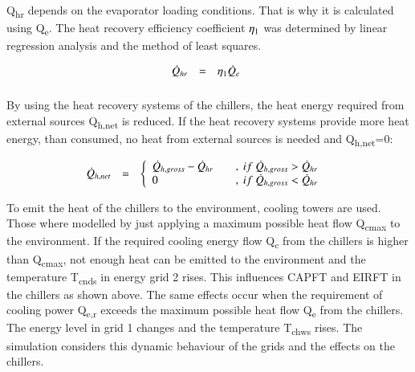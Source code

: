 \documentclass[3p,times,procedia,twocolumn,twoside]{elsarticle}
\begin{document}
Q\textsubscript{hr} depends on the evaporator loading conditions. That is why it is calculated using Q\textsubscript{e}. The heat recovery efficiency coefficient  $ \eta\textsubscript{1} $ was determined by linear regression analysis and the method of least squares.

\begin{equation}
\begin{array}{@{}lcl}
\displaystyle 

\dot{Q}_{hr} &=& \eta_{1}\dot{Q}_{e} 

\\[6pt]
\end{array}\vspace*{-12pt}
\end{equation}

By using the heat recovery systems of the chillers, the heat energy required from external sources Q\textsubscript{h,net} is reduced. If the heat recovery systems provide more heat energy, than consumed, no heat from external sources is needed and Q\textsubscript{h,net}=0:

\begin{equation}
\begin{array}{@{}lcl}
\displaystyle 

\dot{Q}_{h,net} &=&  
\left\{ \begin{array}{lcl}
\dot{Q}_{h,gross} - \dot{Q}_{hr} & &,\ if\ \dot{Q}_{h,gross} > \dot{Q}_{hr} \\ 
0 & &,\ if\ \dot{Q}_{h,gross} < \dot{Q}_{hr}
\end{array}\right.

\\[6pt]
\end{array}\vspace*{-12pt}
\end{equation}

To emit the heat of the chillers to the environment, cooling towers are used. Those where modelled by just applying a maximum possible heat flow Q\textsubscript{cmax} to the environment. If the required cooling energy flow Q\textsubscript{c} from the chillers is higher than Q\textsubscript{cmax}, not enough heat can be emitted to the environment and the temperature T\textsubscript{cnds} in energy grid 2 rises. This influences CAPFT and EIRFT in the chillers as shown above.
The same effects occur when the requirement of cooling power Q\textsubscript{e,r} exceeds the maximum possible heat flow Q\textsubscript{e} from the chillers. The energy level in grid 1 changes and the temperature T\textsubscript{chws} rises. The simulation considers this dynamic behaviour of the grids and the effects on the chillers.
\end{document}
